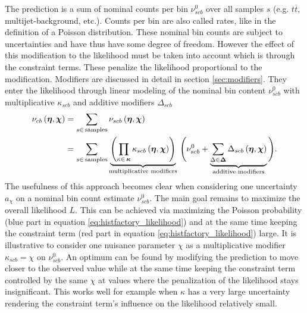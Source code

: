 The prediction is a sum of nominal counts per bin $\nu_{scb}^0$ over all samples $s$ (e.g. $t\overline{t}$, multijet-background, etc.). Counts per bin are also called rates, like in the definition of a Poisson distribution. These nominal bin counts are subject to uncertainties and have thus have some degree of freedom. However the effect of this modification to the likelihood must be taken into account which is through the constraint terms. These penalize the likelihood proportional to the modification. Modifiers are discussed in detail in section \ref{sec:modifiers}. They enter the likelihood through linear modeling of the nominal bin content $\nu_{scb}^0$ with multiplicative $\kappa_{scb}$ and additive modifiers $\Delta_{scb}$
\begin{align}
    \nu_{cb}\left(\bm{\eta},\bm{\chi}\right) & = \sum_{s\in\mathrm{\,samples}} \nu_{scb}\left(\bm{\eta},\bm{\chi}\right)                                                                                                \\
                                             & = \sum_{s\in\mathrm{\,samples}}\underbrace{\left(\prod_{\kappa\in\,\bm{\kappa}} \kappa_{scb}\left(\bm{\eta},\bm{\chi}\right)\right)}_{\text{multiplicative modifiers}}\,
    \Bigg(\nu_{scb}^0 + \underbrace{\sum_{\Delta\in\bm{\Delta}} \Delta_{scb}\left(\bm{\eta},\bm{\chi}\right)}_{\text{additive modifiers}}\Bigg).
    \label{eq:modifier_equation}
\end{align}
The usefulness of this approach becomes clear when considering one uncertainty $a_\chi$ on a nominal bin count estimate $\nu_{scb}^0$. The main goal remains to maximize the overall likelihood $L$. This can be achieved via maximizing the Poisson probability (blue part in equation \ref{eq:histfactory_likelihood}) and at the same time keeping the constraint term (red part in equation \ref{eq:histfactory_likelihood}) large. It is illustrative to consider one nuisance parameter $\chi$ as a multiplicative modifier $\kappa_{scb}=\chi$ on $\nu_{scb}^0$. An optimum can be found by modifying the prediction to move closer to the observed value while at the same time keeping the constraint term controlled by the same $\chi$ at values where the penalization of the likelihood stays insignificant. This works well for example when $\kappa$ has a very large uncertainty rendering the constraint term's influence on the likelihood relatively small.

